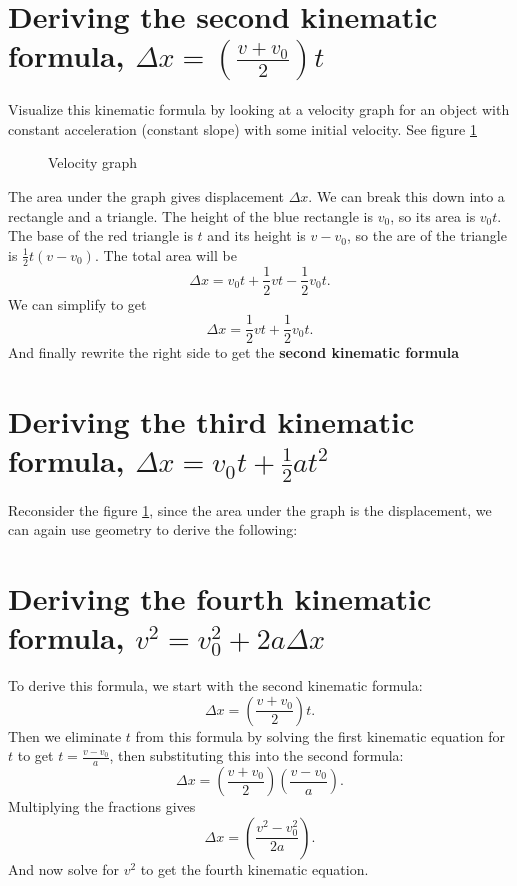 \section{Deriving the second kinematic formula, $\Delta x = \left( \frac{v + v_0}{2} \right) t$}%
\label{sec:deriving_the_second_kinematic_formula_delta_x_left_v + v_0_2_right_t_}

Visualize this kinematic formula by looking at a velocity graph for an object
with constant acceleration (constant slope) with some initial velocity. See figure \ref{fig:velocity-graph}

\begin{figure}[ht]
	\centering
	\caption{Velocity graph}
	\label{fig:velocity-graph}
\end{figure}

The area under the graph gives displacement $\Delta x$. We can break this down into
a rectangle and a triangle. The height of the blue rectangle is $v_0$, so its
area is $v_0t$. The base of the red triangle is $t$ and its height
is $v-v_0$, so the are of the triangle is $\frac{1}{2}t \left( v - v_0 \right) $.
The total area will be \[
	\Delta x = v_0t + \frac{1}{2} v t - \frac{1}{2} v_0 t
	.\] We can simplify to get \[
	\Delta x = \frac{1}{2} v t + \frac{1}{2} v_0 t
.\] And finally rewrite the right side to get the \textbf{second kinematic formula}

\section{Deriving the third kinematic formula, $\Delta x = v_0t + \frac{1}{2} a t^2$}%
\label{sec:deriving_the_third_kinematic_formula_delta_x_v_0t_1_2_a_t_2_}

Reconsider the figure \ref{fig:velocity-graph}, since the area under the graph is
the displacement, we can again use geometry to derive the following:

\section{Deriving the fourth kinematic formula, $v^2 = v_0^2 + 2a \Delta x$}%
\label{sec:deriving_the_fourth_kinematic_formula_v_2_v_0_2_2a_delta_x_}

To derive this formula, we start with the second kinematic formula: \[
	\Delta x = \left( \frac{v + v_0}{2} \right) t
.\] Then we eliminate $t$ from this formula by solving the first kinematic
equation for $t$ to get $t = \frac{v -v_0}{a}$, then substituting this
into the second formula: \[
	\Delta x = \left( \frac{v + v_0}{2} \right) \left( \frac{v - v_0}{a} \right)
	.\] Multiplying the fractions gives \[
	\Delta x = \left( \frac{v^2-v_0^2}{2a} \right)
.\] And now solve for $v^2$ to get the fourth kinematic equation.

